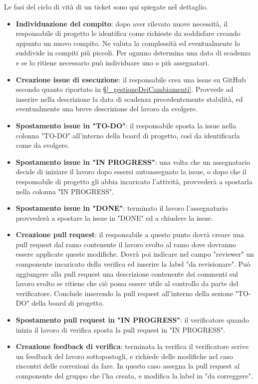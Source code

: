 Le fasi del ciclo di vità di un ticket sono qui spiegate nel dettaglio.
\begin{itemize}
    \item \textbf{Individuazione del compito}: dopo aver rilevato nuove necessità, il responsabile di progetto le identifica come richieste da soddisfare creando appunto un nuovo compito. Ne valuta la complessità ed eventualmente lo suddivide in compiti più piccoli. Per ognuno determina una data di scadenza e se lo ritiene necessario può individuare uno o più assegnatari.
    \item \textbf{Creazione issue di esecuzione}: il responsabile crea una issue su GitHub secondo quanto riportato in \S\ref{_gestioneDeiCambiamenti}. Provvede ad inserire nella descrizione la data di scadenza precedentemente stabilità, ed eventualmente una breve descrizione del lavoro da svolgere.
    \item \textbf{Spostamento issue in "TO-DO"}: il responsabile sposta la issue nella colonna "TO-DO" all'interno della board di progetto, così da identificarla come da svolgere.
    \item \textbf{Spostamento issue in "IN PROGRESS"}: una volta che un assegnatario decide di iniziare il lavoro dopo essersi autoassegnato la issue, o dopo che il responsabile di progetto gli abbia incaricato l'attività, provvederà a spostarla nella colonna "IN PROGRESS".
    \item \textbf{Spostamento issue in "DONE"}: terminato il lavoro l'assegnatario provvederà a spostare la issue in "DONE" ed a chiudere la issue.
    \item \textbf{Creazione pull request}: il responsabile a questo punto dovrà creare una pull request dal ramo contenente il lavoro svolto al ramo dove dovranno essere applicate queste modifiche. Dovrà poi indicare nel campo "reviewer" un componente incaricato della verifica ed inserire la label "da revisionare". Può aggiungere alla pull request una descrizione contenente dei commenti sul lavoro svolto se ritiene che ciò possa essere utile al controllo da parte del verificatore. Conclude inserendo la pull request all'interno della sezione "TO-DO" della board di progetto.
    \item \textbf{Spostamento pull request in "IN PROGRESS"}: il verificatore quando inizia il lavoro di verifica sposta la pull request in "IN PROGRESS".
    \item \textbf{Creazione feedback di verifica}: terminata la verifica il verificatore scrive un feedback del lavoro sottopostogli, e richiede delle modifiche nel caso riscontri delle correzioni da fare. In questo caso assegna la pull request al componente del gruppo che l'ha creata, e modifica la label in "da correggere".

\end{itemize}
